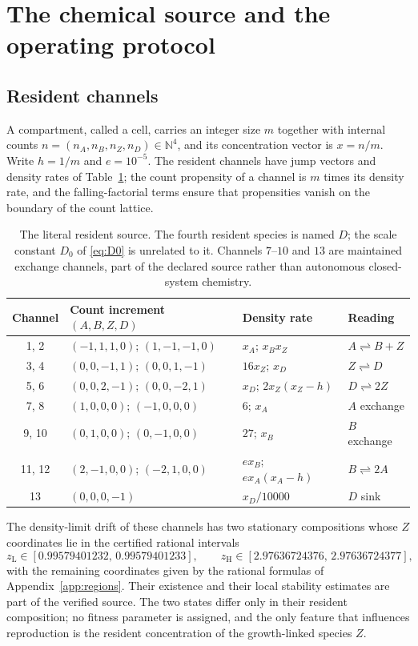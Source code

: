 \documentclass[11pt,a4paper]{article}
\theoremstyle{plain}
\theoremstyle{definition}
\theoremstyle{remark}
\newcommand{\N}{\mathbb N}
\newcommand{\lo}{\mathrm L}
\newcommand{\hi}{\mathrm H}
\begin{document}
\section{The chemical source and the operating protocol}\label{sec:model}

\subsection{Resident channels}\label{sec:chemistry}

A compartment, called a cell, carries an integer size $m$ together with
internal counts $n=(n_A,n_B,n_Z,n_D)\in\N^4$, and its concentration vector is
$x=n/m$. Write $h=1/m$ and $e=10^{-5}$. The resident channels have jump vectors
and density rates of Table~\ref{tab:channels}; the count propensity of a
channel is $m$ times its density rate, and the falling-factorial terms ensure
that propensities vanish on the boundary of the count lattice.

\begin{table}[tb]
\centering\small
\caption{The literal resident source. The fourth resident species is named $D$;
the scale constant $D_0$ of \eqref{eq:D0} is unrelated to it. Channels
$7$--$10$ and $13$ are maintained exchange channels, part of the declared
source rather than autonomous closed-system chemistry.}
\label{tab:channels}
\begin{tabular}{clll}
\toprule
Channel & Count increment $(A,B,Z,D)$ & Density rate & Reading\\
\midrule
1, 2 & $(-1,1,1,0)$; $(1,-1,-1,0)$ & $x_A$; $x_Bx_Z$ & $A\rightleftharpoons B+Z$\\
3, 4 & $(0,0,-1,1)$; $(0,0,1,-1)$ & $16x_Z$; $x_D$ & $Z\rightleftharpoons D$\\
5, 6 & $(0,0,2,-1)$; $(0,0,-2,1)$ & $x_D$; $2x_Z(x_Z-h)$ & $D\rightleftharpoons 2Z$\\
7, 8 & $(1,0,0,0)$; $(-1,0,0,0)$ & $6$; $x_A$ & $A$ exchange\\
9, 10 & $(0,1,0,0)$; $(0,-1,0,0)$ & $27$; $x_B$ & $B$ exchange\\
11, 12 & $(2,-1,0,0)$; $(-2,1,0,0)$ & $ex_B$; $ex_A(x_A-h)$ & $B\rightleftharpoons 2A$\\
13 & $(0,0,0,-1)$ & $x_D/10000$ & $D$ sink\\
\bottomrule
\end{tabular}
\end{table}

The density-limit drift of these channels has two stationary compositions whose
$Z$ coordinates lie in the certified rational intervals
\begin{equation}\label{eq:roots}
z_\lo\in[0.99579401232,\,0.99579401233],\qquad
z_\hi\in[2.97636724376,\,2.97636724377],
\end{equation}
with the remaining coordinates given by the rational formulas of
Appendix~\ref{app:regions}. Their existence and their local stability estimates
are part of the verified source. The two states differ only in their resident
composition; no fitness parameter is assigned, and the only feature that
influences reproduction is the resident concentration of the growth-linked
species $Z$.
\end{document}
